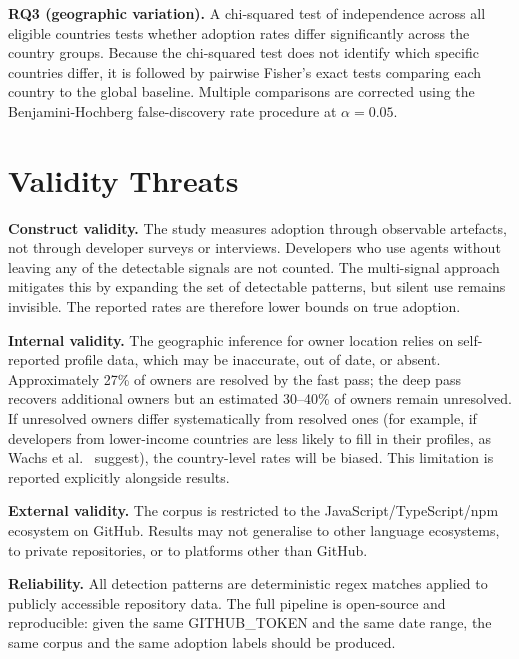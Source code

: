 \documentclass[12pt, a4paper]{article}
\begin{document}
\textbf{RQ3 (geographic variation).} A chi-squared test of independence
across all eligible countries tests whether adoption rates differ
significantly across the country groups. Because the chi-squared test does
not identify which specific countries differ, it is followed by pairwise
Fisher's exact tests comparing each country to the global baseline. Multiple
comparisons are corrected using the Benjamini-Hochberg false-discovery rate
procedure at $\alpha = 0.05$.

\section{Validity Threats}

\textbf{Construct validity.} The study measures adoption through observable
artefacts, not through developer surveys or interviews. Developers who use
agents without leaving any of the detectable signals are not counted. The
multi-signal approach mitigates this by expanding the set of detectable
patterns, but silent use remains invisible. The reported rates are therefore
lower bounds on true adoption.

\textbf{Internal validity.} The geographic inference for owner location
relies on self-reported profile data, which may be inaccurate, out of date,
or absent. Approximately 27\% of owners are resolved by the fast pass;
the deep pass recovers additional owners but an estimated 30--40\% of owners
remain unresolved. If unresolved owners differ systematically from resolved
ones (for example, if developers from lower-income countries are less likely
to fill in their profiles, as Wachs et al.~\cite{wachs2022} suggest), the
country-level rates will be biased. This limitation is reported explicitly
alongside results.

\textbf{External validity.} The corpus is restricted to the
JavaScript/TypeScript/npm ecosystem on GitHub. Results may not generalise to
other language ecosystems, to private repositories, or to platforms other
than GitHub.

\textbf{Reliability.} All detection patterns are deterministic regex matches
applied to publicly accessible repository data. The full pipeline is
open-source and reproducible: given the same GITHUB\_TOKEN and the same date
range, the same corpus and the same adoption labels should be produced.
\end{document}
